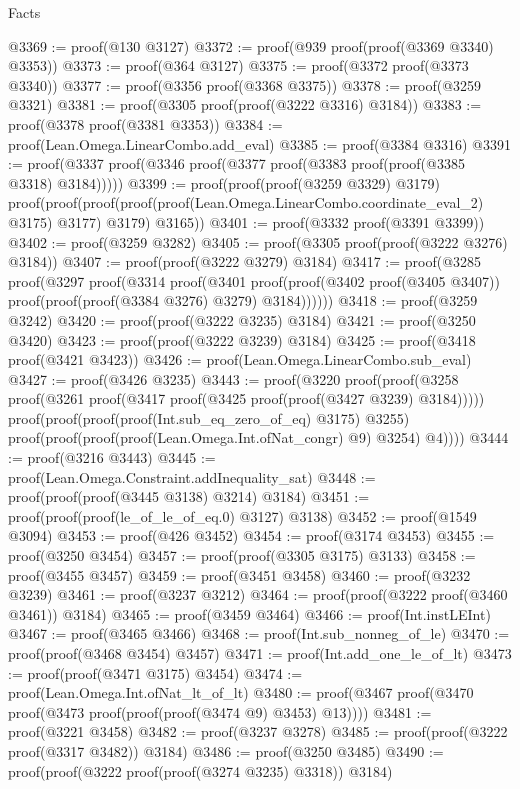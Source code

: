 \begin{lexlean}{Facts}
\begin{coremodule}
@3369 := proof(@130 @3127)
@3372 := proof(@939 proof(proof(@3369 @3340) @3353))
@3373 := proof(@364 @3127)
@3375 := proof(@3372 proof(@3373 @3340))
@3377 := proof(@3356 proof(@3368 @3375))
@3378 := proof(@3259 @3321)
@3381 := proof(@3305 proof(proof(@3222 @3316) @3184))
@3383 := proof(@3378 proof(@3381 @3353))
@3384 := proof(Lean.Omega.LinearCombo.add_eval)
@3385 := proof(@3384 @3316)
@3391 := proof(@3337 proof(@3346 proof(@3377 proof(@3383 proof(proof(@3385 @3318) @3184)))))
@3399 := proof(proof(proof(@3259 @3329) @3179)
      proof(proof(proof(proof(proof(Lean.Omega.LinearCombo.coordinate_eval_2) @3175) @3177) @3179)
          @3165))
@3401 := proof(@3332 proof(@3391 @3399))
@3402 := proof(@3259 @3282)
@3405 := proof(@3305 proof(proof(@3222 @3276) @3184))
@3407 := proof(proof(@3222 @3279) @3184)
@3417 := proof(@3285
      proof(@3297
          proof(@3314
              proof(@3401
                  proof(proof(@3402 proof(@3405 @3407))
                      proof(proof(proof(@3384 @3276) @3279) @3184))))))
@3418 := proof(@3259 @3242)
@3420 := proof(proof(@3222 @3235) @3184)
@3421 := proof(@3250 @3420)
@3423 := proof(proof(@3222 @3239) @3184)
@3425 := proof(@3418 proof(@3421 @3423))
@3426 := proof(Lean.Omega.LinearCombo.sub_eval)
@3427 := proof(@3426 @3235)
@3443 := proof(@3220
      proof(proof(@3258 proof(@3261 proof(@3417 proof(@3425 proof(proof(@3427 @3239) @3184)))))
          proof(proof(proof(proof(Int.sub_eq_zero_of_eq) @3175) @3255)
              proof(proof(proof(proof(Lean.Omega.Int.ofNat_congr) @9) @3254) @4))))
@3444 := proof(@3216 @3443)
@3445 := proof(Lean.Omega.Constraint.addInequality_sat)
@3448 := proof(proof(proof(@3445 @3138) @3214) @3184)
@3451 := proof(proof(proof(le_of_le_of_eq.{0}) @3127) @3138)
@3452 := proof(@1549 @3094)
@3453 := proof(@426 @3452)
@3454 := proof(@3174 @3453)
@3455 := proof(@3250 @3454)
@3457 := proof(proof(@3305 @3175) @3133)
@3458 := proof(@3455 @3457)
@3459 := proof(@3451 @3458)
@3460 := proof(@3232 @3239)
@3461 := proof(@3237 @3212)
@3464 := proof(proof(@3222 proof(@3460 @3461)) @3184)
@3465 := proof(@3459 @3464)
@3466 := proof(Int.instLEInt)
@3467 := proof(@3465 @3466)
@3468 := proof(Int.sub_nonneg_of_le)
@3470 := proof(proof(@3468 @3454) @3457)
@3471 := proof(Int.add_one_le_of_lt)
@3473 := proof(proof(@3471 @3175) @3454)
@3474 := proof(Lean.Omega.Int.ofNat_lt_of_lt)
@3480 := proof(@3467 proof(@3470 proof(@3473 proof(proof(proof(@3474 @9) @3453) @13))))
@3481 := proof(@3221 @3458)
@3482 := proof(@3237 @3278)
@3485 := proof(proof(@3222 proof(@3317 @3482)) @3184)
@3486 := proof(@3250 @3485)
@3490 := proof(proof(@3222 proof(proof(@3274 @3235) @3318)) @3184)

\end{coremodule}
\end{lexlean}
